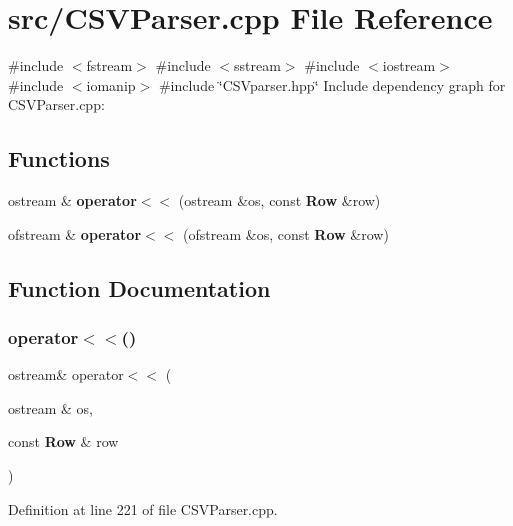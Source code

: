 \section{src/\+C\+S\+V\+Parser.cpp File Reference}
\label{_c_s_v_parser_8cpp}
{\ttfamily \#include $<$fstream$>$}\newline
{\ttfamily \#include $<$sstream$>$}\newline
{\ttfamily \#include $<$iostream$>$}\newline
{\ttfamily \#include $<$iomanip$>$}\newline
{\ttfamily \#include \char`\"{}C\+S\+Vparser.\+hpp\char`\"{}}\newline
Include dependency graph for C\+S\+V\+Parser.\+cpp\+:
\subsection*{Functions}
\begin{DoxyCompactItemize}
\item 
ostream \& \textbf{ operator$<$$<$} (ostream \&os, const \textbf{ Row} \&row)
\item 
ofstream \& \textbf{ operator$<$$<$} (ofstream \&os, const \textbf{ Row} \&row)
\end{DoxyCompactItemize}


\subsection{Function Documentation}
\mbox{\label{_c_s_v_parser_8cpp_a8962fdc6373687757234a811e803a1da}} 
\subsubsection{operator$<$$<$()\hspace{0.1cm}{\footnotesize\ttfamily [1/2]}}
{\footnotesize\ttfamily ostream\& operator$<$$<$ (\begin{DoxyParamCaption}\item[{ostream \&}]{os,  }\item[{const \textbf{ Row} \&}]{row }\end{DoxyParamCaption})}



Definition at line 221 of file C\+S\+V\+Parser.\+cpp.



